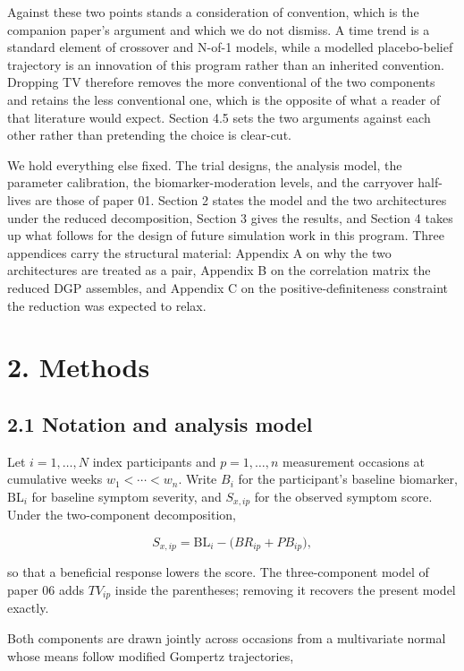 \documentclass[
  11pt,
]{article}
\begin{document}
Against these two points stands a consideration of convention, which
is the companion paper's argument and which we do not dismiss. A time
trend is a standard element of crossover and N-of-1 models, while a
modelled placebo-belief trajectory is an innovation of this program
rather than an inherited convention. Dropping TV therefore removes
the more conventional of the two components and retains the less
conventional one, which is the opposite of what a reader of that
literature would expect. Section 4.5 sets the two arguments against
each other rather than pretending the choice is clear-cut.

We hold everything else fixed. The trial designs, the analysis model,
the parameter calibration, the biomarker-moderation levels, and the
carryover half-lives are those of paper 01. Section 2 states the
model and the two architectures under the reduced decomposition,
Section 3 gives the results, and Section 4 takes up what follows for
the design of future simulation work in this program. Three
appendices carry the structural material: Appendix A on why the two
architectures are treated as a pair, Appendix B on the correlation
matrix the reduced DGP assembles, and Appendix C on the
positive-definiteness constraint the reduction was expected to
relax.

\section{2. Methods}

\subsection{2.1 Notation and analysis model}

Let \(i = 1, \dots, N\) index participants and \(p = 1, \dots, n\)
measurement occasions at cumulative weeks \(w_1 < \cdots < w_n\). Write
\(B_i\) for the participant's baseline biomarker, \(\mathrm{BL}_i\) for
baseline symptom severity, and \(S_{x,ip}\) for the observed symptom
score. Under the two-component decomposition,

\[
S_{x,ip} = \mathrm{BL}_i - \big( BR_{ip} + PB_{ip} \big),
\]

so that a beneficial response lowers the score. The three-component
model of paper 06 adds \(TV_{ip}\) inside the parentheses; removing it
recovers the present model exactly.

Both components are drawn jointly across occasions from a
multivariate normal whose means follow modified Gompertz
trajectories,
\end{document}
